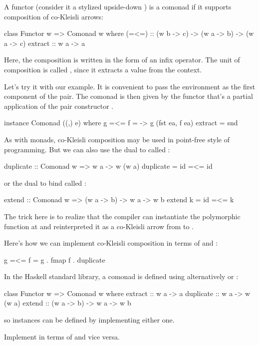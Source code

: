\documentclass[DaoFP]{subfiles}
\begin{document}
A functor  (consider it a stylized upside-down ) is a comonad if it supports composition of co-Kleisli arrows:

\begin{haskell}
class Functor w => Comonad w where
   (=<=) :: (w b -> c) -> (w a -> b) -> (w a -> c)
   extract :: w a -> a
\end{haskell}
Here, the composition is written in the form of an infix operator. The unit of composition is called , since it extracts a value from the context. 

Let's try it with our example. It is convenient to pass the environment as the first component of the pair. The comonad is then given by the functor that's a partial application of the pair constructor .
\begin{haskell}
instance Comonad ((,) e) where
  g =<= f = \ea -> g (fst ea, f ea)
  extract = snd
\end{haskell}

As with monads, co-Kleisli composition may be used in point-free style of programming. But we can also use the dual to  called :
\begin{haskell}
duplicate :: Comonad w => w a -> w (w a)
duplicate = id =<= id
\end{haskell}
or the dual to bind called :
\begin{haskell}
extend :: Comonad w => (w a -> b) -> w a -> w b
extend k = id =<= k
\end{haskell}
The trick here is to realize that the compiler can instantiate the polymorphic function  at  and reinterpreted it as a co-Kleisli arrow from  to .

Here's how we can implement co-Kleisli composition in terms of  and :
\begin{haskell}
   g =<= f = g . fmap f . duplicate
\end{haskell}

In the Haskell standard library, a comonad is defined using alternatively  or :
\begin{haskell}
class Functor w => Comonad w where
  extract :: w a -> a
  duplicate :: w a -> w (w a)
  extend :: (w a -> b) -> w a -> w b
\end{haskell}
so  instances can be defined by implementing either one.

\begin{exercise}
Implement  in terms of  and vice versa.
\end{exercise}
\end{document}
